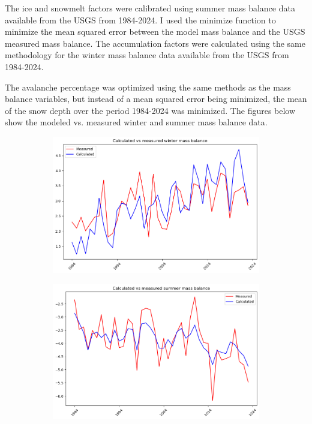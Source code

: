 \documentclass{article}
\begin{document}
The ice and snowmelt factors were calibrated using summer mass balance data available from the USGS from 1984-2024. I used the minimize function 
to minimize the mean squared error between the model mass balance and the USGS measured mass balance. The accumulation factors were calculated using 
the same methodology for the winter mass balance data available from the USGS from 1984-2024.

The avalanche percentage was optimized using the same methods as the mass balance variables, but instead of a mean squared error being 
minimized, the mean of the snow depth over the period 1984-2024 was minimized.
The figures below show the modeled vs. measured winter and summer mass balance data.

\begin{figure}[h]
    \centering
    \begin{subfigure}[b]{0.49\textwidth}
        \centering
        \includegraphics[width=\textwidth]{Plots/winter_mb_compare.png}
        \label{fig:winter_mb_compare}
    \end{subfigure}
    \hfill
    \begin{subfigure}[b]{0.49\textwidth}
        \centering
        \includegraphics[width=\textwidth]{Plots/summer_mb_compare.png}

\end{subfigure}
\end{figure}
\end{document}
